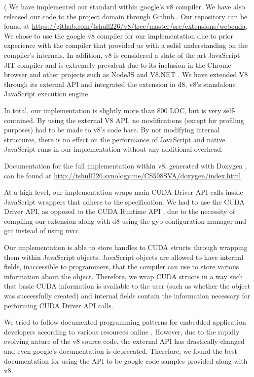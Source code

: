 

(
We have implemented our \name standard within google's v8 \cite{v8} compiler. We
have also released our code to the project domain through Github \cite{github}.
Our repository can be found at
\url{https://github.com/tshull226/v8/tree/master/src/extensions/webcuda}.  We chose to use
the google v8  compiler for our implementation due to prior experience with the
compiler that provided us with a solid understanding on the compiler's
internals. In addition, v8 is considered a state of the art JavaScript JIT
compiler and is extremely prevalent due to its inclusion in the Chrome browser
\cite{chrome} and other projects such as NodeJS \cite{nodeJS} and V8.NET
\cite{V8.NET}. We have extended V8 through its external API and integrated the
extension in d8, v8's standalone JavaScript execution engine. 

In total, our implementation is slightly more than 800 LOC, but is very
self-contained. By using the external V8 API, no modifications (except for
profiling purposes) had to be made to v8's code base. By not modifying internal
structures, there is no effect on the performance of JavaScript and native
JavaScript runs in our implementation without any additional overhead.

Documentation for the full \name implementation within v8,
generated with Doxygen \cite{doxygen}, can be found at
\url{http://tshull226.synology.me/CS598SVA/doxygen/index.html}

At a high level, our implementation wraps main CUDA Driver API
\cite{cudaDriverAPI} calls inside JavaScript wrappers that adhere to the \name
specification. We had to use the CUDA Driver API, as opposed to the CUDA Runtime
API \cite{cudaRuntimeAPI}, due to the necessity of compiling our extension along
with d8 using the gyp \cite{gyp} configuration manager and gcc
\cite{gcc} instead of using nvcc \cite{nvcc}.

Our implementation is able to store handles to CUDA structs through wrapping them
within JavaScript objects. JavaScript objects are allowed to have internal
fields, inaccessible to programmers, that the compiler can use to store various
information about the object. Therefore, we wrap CUDA structs in a way such that
basic CUDA information is available to the user (such as whether the object was
successfully created) and internal fields contain the information
necessary for performing CUDA Driver API calls.

We tried to follow documented programming patterns for embedded application
developers according to various resources online
\cite{embeddersGuide, nodeJSDocumentation}. However, due to the rapidly evolving
nature of the v8 source code, the external API has drastically changed and even
google's documentation \cite{embeddersGuide} is deprecated. Therefore, we found
the best documentation for using the API to be google code samples provided
along with v8.

